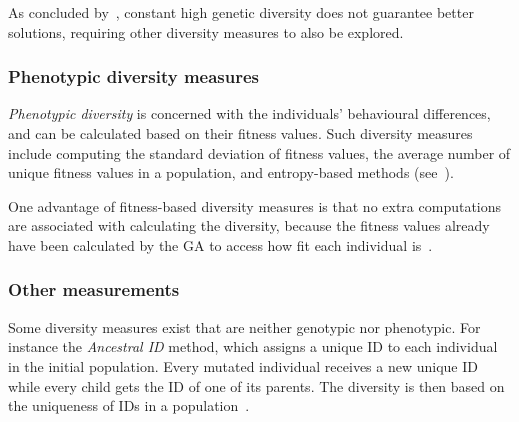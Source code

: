 As concluded by~\cite{Darwen00doesextra}, constant high genetic diversity does not guarantee better solutions, requiring other diversity measures to also be explored.

\subsubsection{Phenotypic diversity measures}
\emph{Phenotypic diversity} is concerned with the individuals' behavioural differences, and can be calculated based on their fitness values. Such diversity measures include computing the standard deviation of fitness values, the average number of unique fitness values in a population, and entropy-based methods (see~\cite{1250187, 1266373}).

One advantage of fitness-based diversity measures is that no extra computations are associated with calculating the diversity, because the fitness values already have been calculated by the GA to access how fit each individual is~\cite{Nguyen:2006:ASPGP}.

\subsubsection{Other measurements}
Some diversity measures exist that are neither genotypic nor phenotypic. For instance the \emph{Ancestral ID} method, which assigns a unique ID to each individual in the initial population. Every mutated individual receives a new unique ID while every child gets the ID of one of its parents. The diversity is then based on the uniqueness of IDs in a population~\cite{1250187}.

